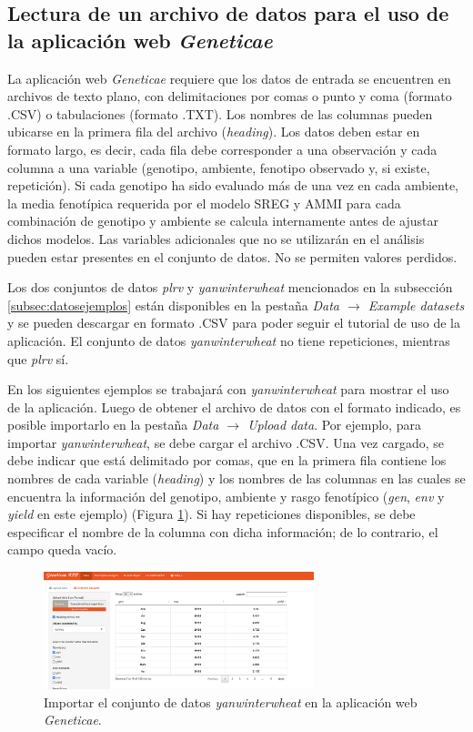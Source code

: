 \subsection{Lectura de un archivo de datos para el uso de la aplicación web \emph{Geneticae}}

La aplicación web \emph{Geneticae} requiere que los datos de entrada se encuentren en archivos de texto plano, con delimitaciones por comas o punto y coma (formato .CSV) o tabulaciones (formato .TXT). Los nombres de las columnas pueden ubicarse en la primera fila del archivo (\emph{heading}). Los datos deben estar en formato largo, es decir, cada fila debe corresponder a una observación y cada columna a una variable (genotipo, ambiente, fenotipo observado y, si existe, repetición). Si cada genotipo ha sido evaluado más de una vez en cada ambiente, la media fenotípica requerida por el modelo SREG y AMMI para cada combinación de genotipo y ambiente se calcula internamente antes de ajustar dichos modelos. Las variables adicionales que no se utilizarán en el análisis pueden estar presentes en el conjunto de datos. No se permiten valores perdidos.

Los dos conjuntos de datos \emph{plrv} y \emph{yanwinterwheat} mencionados en la subsección \ref{subsec:datosejemplos} están disponibles en la pestaña \emph{Data $\rightarrow$ Example datasets} y se pueden descargar en formato .CSV para poder seguir el tutorial de uso de la aplicación. El conjunto de datos \emph{yanwinterwheat} no tiene repeticiones, mientras que \emph{plrv} sí. 

En los siguientes ejemplos se trabajará con \emph{yanwinterwheat} para mostrar el uso de la aplicación. Luego de obtener el archivo de datos con el formato indicado, es posible importarlo en la pestaña \emph{Data $\rightarrow$ Upload data}. Por ejemplo, para importar \emph{yanwinterwheat}, se debe cargar el archivo .CSV. Una vez cargado, se debe indicar que está delimitado por comas, que en la primera fila contiene los nombres de cada variable (\emph{heading}) y los nombres de las columnas en las cuales se encuentra la información del genotipo, ambiente y rasgo fenotípico (\emph{gen}, \emph{env} y \emph{yield} en este ejemplo) (Figura \ref{fig:fig431}). Si hay repeticiones disponibles, se debe especificar el nombre de la columna con dicha información; de lo contrario, el campo queda vacío. 

 \begin{figure}[h]
	\begin{center}
		\includegraphics[width=0.7\textwidth]{./Graficos/www/Data.png}
	\end{center}
	\caption{Importar el conjunto de datos \emph{yanwinterwheat} en la aplicación web \emph{Geneticae}.}
	\label{fig:fig431}
\end{figure}

